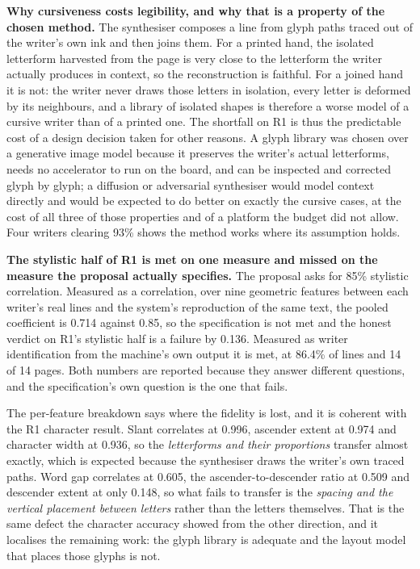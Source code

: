         \textbf{Why cursiveness costs legibility, and why that is a property of the chosen method.}
        The synthesiser composes a line from glyph paths traced out of the writer's own ink and then joins them.
        For a printed hand, the isolated letterform harvested from the page is very close to the letterform the writer actually produces in context, so the reconstruction is faithful.
        For a joined hand it is not: the writer never draws those letters in isolation, every letter is deformed by its neighbours, and a library of isolated shapes is therefore a worse model of a cursive writer than of a printed one.
        The shortfall on R1 is thus the predictable cost of a design decision taken for other reasons.
        A glyph library was chosen over a generative image model because it preserves the writer's actual letterforms, needs no accelerator to run on the board, and can be inspected and corrected glyph by glyph; a diffusion or adversarial synthesiser would model context directly and would be expected to do better on exactly the cursive cases, at the cost of all three of those properties and of a platform the budget did not allow.
        Four writers clearing 93\% shows the method works where its assumption holds.

        \textbf{The stylistic half of R1 is met on one measure and missed on the measure the proposal actually specifies.}
        The proposal asks for 85\% stylistic correlation. Measured as a correlation, over nine geometric features between each writer's real lines and the system's reproduction of the same text, the pooled coefficient is 0.714 against 0.85, so the specification is not met and the honest verdict on R1's stylistic half is a failure by 0.136.
        Measured as writer identification from the machine's own output it is met, at 86.4\% of lines and 14 of 14 pages.
        Both numbers are reported because they answer different questions, and the specification's own question is the one that fails.

        The per-feature breakdown says where the fidelity is lost, and it is coherent with the R1 character result.
        Slant correlates at 0.996, ascender extent at 0.974 and character width at 0.936, so the \emph{letterforms and their proportions} transfer almost exactly, which is expected because the synthesiser draws the writer's own traced paths.
        Word gap correlates at 0.605, the ascender-to-descender ratio at 0.509 and descender extent at only 0.148, so what fails to transfer is the \emph{spacing and the vertical placement between letters} rather than the letters themselves.
        That is the same defect the character accuracy showed from the other direction, and it localises the remaining work: the glyph library is adequate and the layout model that places those glyphs is not.

